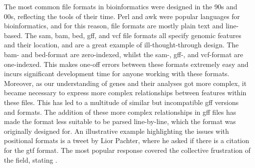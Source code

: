 The most common file formats in bioinformatics were designed in the 90s and 00s, reflecting the tools of their time. Perl and awk were popular languages for bioinformatics, and for this reason, file formats are mostly plain text and line-based. The sam, bam, bed, gff, and vcf file formats all specify genomic features and their location, and are a great example of ill-thought-through design. The bam- and bed-format are zero-indexed\cite{Li2009}, whilst the sam-, gff-, and vcf-format are one-indexed\cite{Li2009,Danecek2011}. This makes one-off errors between these formats extremely easy and incurs significant development time for anyone working with these formats. Moreover, as our understanding of genes and their analyses got more complex, it became necessary to express more complex relationships between features within these files. This has led to a multitude of similar but incompatible gff versions and formats. The addition of these more complex relationships in gff files has made the format less suitable to be parsed line-by-line, which the format was originally designed for. An illustrative example highlighting the issues with positional formats is a tweet by Lior Pachter, where he asked if there is a citation for the gtf format. The most popular response covered the collective frustration of the field, stating .

